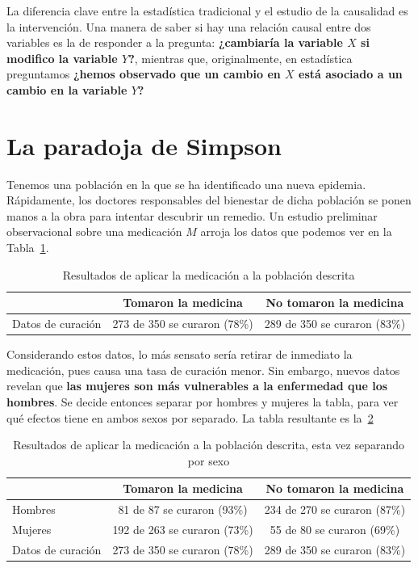 \documentclass[a4paper,11pt,spanish, twoside]{tfg-uam-matematicas_25-26}
\theoremstyle{definition}
\begin{document}
La diferencia clave entre la estadística tradicional y el estudio de la causalidad es la intervención. Una manera de saber si hay una relación causal entre dos variables es la de responder a la pregunta: \textbf{¿cambiaría la variable $X$ si modifico la variable $Y$?}, mientras que, originalmente, en estadística preguntamos \textbf{¿hemos observado que un cambio en $X$ está asociado a un cambio en la variable $Y$?}
\section{La paradoja de Simpson}
Tenemos una población en la que se ha identificado una nueva epidemia. Rápidamente, los doctores responsables del bienestar de dicha población se ponen manos a la obra para intentar descubrir un remedio. Un estudio preliminar observacional sobre una medicación $M$ arroja los datos que podemos ver en la Tabla~\ref{tab:drug-no-gender}.

\begin{table}[ht]
    \centering
    \caption{Resultados de aplicar la medicación a la población descrita}
    \label{tab:drug-no-gender}
    \begin{tabular}{@{}lcc@{}}
    \toprule
    & \textbf{Tomaron la medicina} & \textbf{No tomaron la medicina} \\
    \midrule
    Datos de curación  & 273 de 350 se curaron (78\%) & 289 de 350 se curaron (83\%) \\
    \bottomrule
    \end{tabular}
\end{table}

Considerando estos datos, lo más sensato sería retirar de inmediato la medicación, pues causa una tasa de curación menor. Sin embargo, nuevos datos revelan que \textbf{las mujeres son más vulnerables a la enfermedad que los hombres}. Se decide entonces separar por hombres y mujeres la tabla, para ver qué efectos tiene en ambos sexos por separado. La tabla resultante es la~\ref{tab:drug-gender}

\begin{table}[ht]
    \centering
    \caption{Resultados de aplicar la medicación a la población descrita, esta vez separando por sexo}
    \label{tab:drug-gender}
    \begin{tabular}{@{}lcc@{}}
    \toprule
    & \textbf{Tomaron la medicina} & \textbf{No tomaron la medicina} \\
    \midrule
    Hombres            & 81 de 87 se curaron (93\%)   & 234 de 270 se curaron (87\%) \\
    Mujeres          & 192 de 263 se curaron (73\%) & 55 de 80 se curaron (69\%)   \\
    Datos de curación  & 273 de 350 se curaron (78\%) & 289 de 350 se curaron (83\%) \\
    \bottomrule
    \end{tabular}
\end{table}
\end{document}
